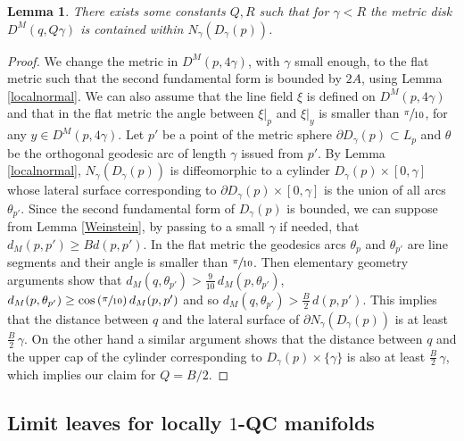 \documentclass[10pt]{amsart}
\newtheorem{lemma}[theorem]{Lemma}
\theoremstyle{definition}
\theoremstyle{remark}
\numberwithin{equation}{section}
\let\Subsection\subsection\let\Subsubsection\subsubsection
\begin{document}
\begin{lemma}\label{round}
There exists some constants $Q, R$ such that for $\gamma < R$
the metric disk $D^M(q,Q \gamma)$ is contained within $N_{\gamma}(D_{\gamma}(p))$.
\end{lemma}
\begin{proof}
We change the metric in $D^M(p,4\gamma)$, with $\gamma$ small enough, to the flat metric such that
the second fundamental form is bounded by $2A$, using Lemma \ref{localnormal}.
We can also assume that the line field $\xi$ is defined on $D^M(p,4\gamma)$ and that in the flat
metric the angle between $\xi|_p$ and $\xi|_y$ is smaller than $\sfrac{\pi}{10}$, for any $y\in D^M(p,4\gamma)$.
Let $p'$ be a point of the metric sphere $\partial D_{\gamma}(p)\subset L_p$ and $\theta$ be the
orthogonal geodesic arc of length $\gamma$ issued from $p'$.
By Lemma \ref{localnormal}, $N_{\gamma}(D_{\gamma}(p))$ is diffeomorphic to a cylinder
$D_{\gamma}(p)\times [0,\gamma]$ whose lateral surface corresponding to
$\partial D_{\gamma}(p)\times [0,\gamma]$ is the union of all arcs $\theta_{p'}$. Since the second fundamental form of $D_{\gamma}(p)$ is bounded,
we can suppose from Lemma \ref{Weinstein}, by passing to a small $\gamma$ if needed, that
$d_M(p,p')\geq B d(p,p')$.
In the flat metric the geodesics arcs $\theta_p$ and $\theta_{p'}$ are line segments and their angle
is smaller than $\sfrac{\pi}{10}$. Then elementary geometry arguments show that
$d_M(q,\theta_{p'}) > \frac{9}{10}\,d_M(p,\theta_{p'})$,
$d_M(p,\theta_{p'})\geq \cos\left(\sfrac{\pi}{10}\right)d_M(p,p')$
and so $d_{M}(q, \theta_{p'}) > \frac{B}{2}\, d(p,p')$. This implies that the distance between $q$ and the
lateral surface of $\partial N_{\gamma}(D_{\gamma}(p))$ is at least $\frac{B}{2}\,\gamma$. On the other hand
a similar argument shows that the distance between $q$ and the upper cap of the cylinder
corresponding to $D_{\gamma}(p)\times \{\gamma\}$ is also at least $\frac{B}{2}\,\gamma$, which implies our claim
for $Q=B/2$.
\end{proof}

\Subsection{Limit leaves for locally $1$-QC manifolds}
\end{document}

